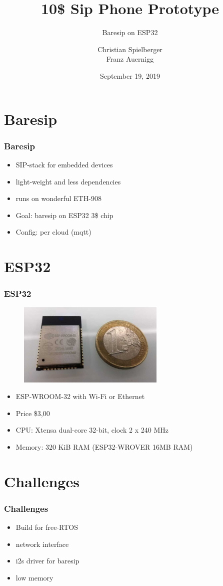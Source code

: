 \documentclass{beamer}
\title{10\$ Sip Phone Prototype}
\subtitle{Baresip on ESP32}
\author{Christian Spielberger\\Franz Auernigg}
\date{September 19, 2019}
\begin{document}

\maketitle

\section{Baresip}
\begin{frame}
\frametitle{Baresip}
\begin{itemize}
\item SIP-stack for embedded devices
  
\item light-weight and less dependencies

\item runs on wonderful ETH-908
\vspace{10mm}
\item Goal: baresip on ESP32 3\$ chip
\item Config: per cloud (mqtt)
\end{itemize}
\end{frame}


 \section{ESP32}

\begin{frame}
\frametitle{ESP32}
\begin{figure}
  \includegraphics[width=7cm]{esp32.jpeg}
\end{figure}
\begin{itemize}
 \item ESP-WROOM-32 with Wi-Fi or Ethernet
 \item Price \$3,00
 \item CPU: Xtensa dual-core 32-bit, clock 2 x 240 MHz
 \item Memory: 320 KiB RAM (ESP32-WROVER 16MB RAM)
\end{itemize}
\end{frame}

 \section{Challenges}
\begin{frame}
\frametitle{Challenges}
\begin{itemize}
 \item Build for free-RTOS
 \item network interface
 \item i2s driver for baresip
 \item low memory
\end{itemize}
\end{frame}
\end{document}
